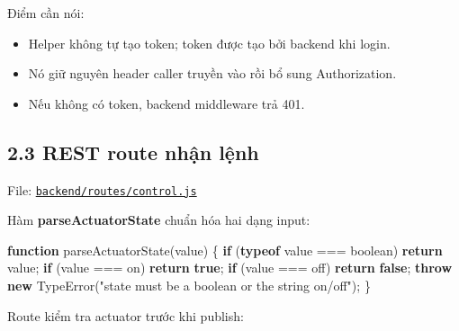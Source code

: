 \documentclass[11pt,oneside,openany]{book}
\newenvironment{Shaded}{\begin{snugshade}}{\end{snugshade}}
\newcommand{\BuiltInTok}[1]{\textcolor[rgb]{0.50,0.55,0.55}{#1}}
\newcommand{\ControlFlowTok}[1]{\textcolor[rgb]{0.99,0.74,0.29}{\textbf{#1}}}
\newcommand{\FunctionTok}[1]{\textcolor[rgb]{0.56,0.27,0.68}{#1}}
\newcommand{\KeywordTok}[1]{\textcolor[rgb]{0.81,0.81,0.76}{\textbf{#1}}}
\newcommand{\NormalTok}[1]{\textcolor[rgb]{0.81,0.81,0.76}{#1}}
\newcommand{\OperatorTok}[1]{\textcolor[rgb]{0.81,0.81,0.76}{#1}}
\newcommand{\StringTok}[1]{\textcolor[rgb]{0.96,0.31,0.31}{#1}}
\renewenvironment{Shaded}{%
  \def\FrameCommand{\fboxsep=8pt\colorbox{shadecolor}}%
  \MakeFramed{\advance\hsize-\width\FrameRestore}%
}{\endMakeFramed}
\providecommand{\tightlist}{\setlength{\itemsep}{1pt}\setlength{\parskip}{0pt}}
\begin{document}
Điểm cần nói:

\begin{itemize}
\tightlist
\item
  Helper không tự tạo token; token được tạo bởi backend khi login.
\item
  Nó giữ nguyên header caller truyền vào rồi bổ sung Authorization.
\item
  Nếu không có token, backend middleware trả 401.
\end{itemize}

\subsection{2.3 REST route nhận
lệnh}\label{23-rest-route-nhux1eadn-lux1ec7nh}

File:
\href{../backend/routes/control.js}{\nolinkurl{backend/routes/control.js}}

Hàm \textbf{parseActuatorState} chuẩn hóa hai dạng input:

\begin{Shaded}
\begin{Highlighting}[]
\KeywordTok{function} \FunctionTok{parseActuatorState}\NormalTok{(value) \{}
  \ControlFlowTok{if}\NormalTok{ (}\KeywordTok{typeof}\NormalTok{ value }\OperatorTok{===} \StringTok{\textquotesingle{}boolean\textquotesingle{}}\NormalTok{) }\ControlFlowTok{return}\NormalTok{ value}\OperatorTok{;}
  \ControlFlowTok{if}\NormalTok{ (value }\OperatorTok{===} \StringTok{\textquotesingle{}on\textquotesingle{}}\NormalTok{) }\ControlFlowTok{return} \KeywordTok{true}\OperatorTok{;}
  \ControlFlowTok{if}\NormalTok{ (value }\OperatorTok{===} \StringTok{\textquotesingle{}off\textquotesingle{}}\NormalTok{) }\ControlFlowTok{return} \KeywordTok{false}\OperatorTok{;}
  \ControlFlowTok{throw} \KeywordTok{new} \BuiltInTok{TypeError}\NormalTok{(}\StringTok{"state must be a boolean or the string \textquotesingle{}on\textquotesingle{}/\textquotesingle{}off\textquotesingle{}"}\NormalTok{)}\OperatorTok{;}
\NormalTok{\}}
\end{Highlighting}
\end{Shaded}

Route kiểm tra actuator trước khi publish:
\end{document}
